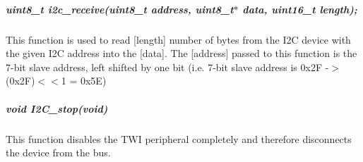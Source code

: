 \subparagraph*{uint8\+\_\+t i2c\+\_\+receive(uint8\+\_\+t address, uint8\+\_\+t$\ast$ data, uint16\+\_\+t length);}

This function is used to read \mbox{[}length\mbox{]} number of bytes from the I2C device with the given I2C address into the \mbox{[}data\mbox{]}. The \mbox{[}address\mbox{]} passed to this function is the 7-\/bit slave address, left shifted by one bit (i.\+e. 7-\/bit slave address is {\ttfamily 0x2F} -\/$>$ {\ttfamily (0x2F)$<$$<$1} = {\ttfamily 0x5E})

\subparagraph*{void I2\+C\+\_\+stop(void)}

This function disables the T\+WI peripheral completely and therefore disconnects the device from the bus. 